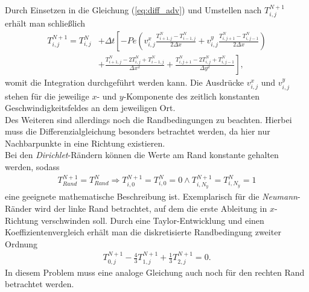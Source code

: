 \documentclass[12pt,a4paper,titlepage,headinclude,bibtotoc]{scrartcl}
\begin{document}
Durch Einsetzen in die Gleichung (\ref{eq:diff_adv}) und Umstellen nach $T_{i,j}^{N+1}$ erhält man schließlich %
\begin{align}
\label{eq:ftcs}
T_{i,j}^{N+1} = T_{i,j}^N &+ \Delta t \left[ -Pe \left( v^x_{i,j} \frac{T_{i+1,j}^N-T_{i-1,j}^N}{2\Delta x}+v^y_{i,j} \frac{T_{i,j+1}^N-T_{i,j-1}^N}{2\Delta x} \right) \right. \nonumber \\ 
 & \left.+ \frac{ T_{i+1,j}^N - 2 T_{i,j}^N +  T_{i-1,j}^N }{\Delta x^2} 
+ \frac{ T_{i,j+1}^N - 2  T_{i,j}^N + T_{i,j-1}^N}{\Delta y^2} \right],
\end{align}
womit die Integration durchgeführt werden kann. Die Ausdrücke $v^x_{i,j}$ und $v^y_{i,j}$ stehen für die jeweilige $x$- und $y$-Komponente des zeitlich konstanten Geschwindigkeitsfeldes an dem jeweiligen Ort.\\
Des Weiteren sind allerdings noch die Randbedingungen zu beachten. Hierbei muss die Differenzialgleichung besonders betrachtet werden, da hier nur Nachbarpunkte in eine Richtung existieren.\\
Bei den \textit{Dirichlet}-Rändern können die Werte am Rand konstante gehalten werden, sodass
\begin{align*}
T^{N+1}_{Rand} = T^{N}_{Rand} \Rightarrow T^{N+1}_{i,0} = T^{N}_{i,0} = 0 \land T^{N+1}_{i,N_y} = T^{N}_{i,N_y} = 1
\end{align*}
eine geeignete mathematische Beschreibung ist. Exemplarisch für die \textit{Neumann}-Ränder wird der linke Rand betrachtet, auf dem die erste Ableitung in $x$-Richtung verschwinden soll. Durch eine Taylor-Entwicklung und einen Koeffizientenvergleich erhält man die diskretisierte Randbedingung zweiter Ordnung
\begin{align*}
T_{0,j}^{N+1} - \frac{4}{3} T_{1,j}^{N+1} + \frac{1}{3} T_{2,j}^{N+1} = 0.
\end{align*}
In diesem Problem muss eine analoge Gleichung auch noch für den rechten Rand betrachtet werden.
\end{document}
